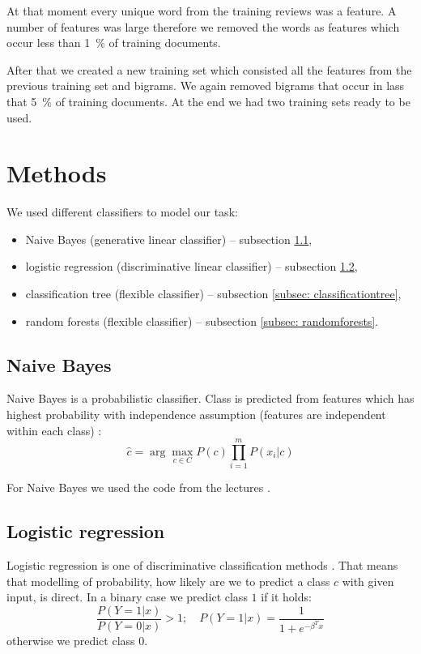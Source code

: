 \documentclass[a4paper,11pt]{article}
\begin{document}
At that moment every unique word from the training reviews was a feature.  A number of features was large %
therefore we removed the words as features which occur less than 1~\% of training documents.

After that we created a new training set which consisted all the features from the previous training set and bigrams. We again removed bigrams that occur in lass that  5~\% of training documents. At the end we had two training sets ready to be used. 

\section{Methods}
\label{sec: methods}

We used different classifiers to model our task:
\begin{itemize}
	\item Naive Bayes (generative linear classifier) -- subsection \ref{subsec: naivebayes},
	\item logistic regression (discriminative linear classifier) -- subsection \ref{subsec: logisticregression},
	\item classification tree (flexible classifier) -- subsection \ref{subsec: classificationtree},
	\item random forests (flexible classifier) -- subsection \ref{subsec: randomforests}.
\end{itemize}

\subsection{Naive Bayes}
\label{subsec: naivebayes}
Naive Bayes is a probabilistic classifier. Class is predicted from features which has highest probability with independence assumption (features are independent within each class) \cite{naiveBayes}:
\[
\hat{c} = \arg\max_{c \in C} P(c) \prod_{i = 1}^m P(x_i | c)
\]

For Naive Bayes we used the code from the lectures \cite{code}. 

\subsection{Logistic regression}
\label{subsec: logisticregression}
Logistic regression is one of discriminative classification methods \cite{logisticRegression}. That means that modelling of probability, how likely are we to predict a class $c$ with given input, is direct. In a binary case we predict class $1$ if it holds:
\[
\frac{P(Y = 1 | x)}{P(Y = 0 | x)} > 1; \quad P (Y = 1 | x) = \frac{1}{1 + e^{-\beta^T x}}
\]
otherwise we predict class $0$.
\end{document}
